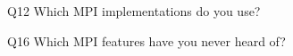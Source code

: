 \begin{description}%
\item{Q12} Which MPI implementations do you use?%
\item{Q16} Which MPI features have you never heard of?%
\end{description}%
